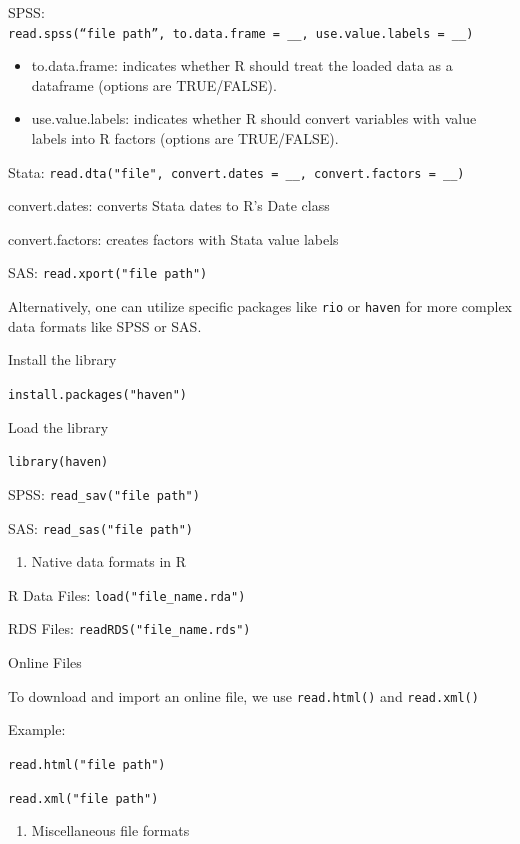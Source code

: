 \documentclass[
  letterpaper,
  DIV=11,
  numbers=noendperiod]{scrreprt}
\providecommand{\tightlist}{%
  \setlength{\itemsep}{0pt}\setlength{\parskip}{0pt}}\usepackage{longtable,booktabs,array}
\begin{document}
SPSS:
\texttt{read.spss(“file\ path”,\ to.data.frame\ =\ \_\_,\ use.value.labels\ =\ \_\_)}

\begin{itemize}
\item
  to.data.frame: indicates whether R should treat the loaded data as a
  dataframe (options are TRUE/FALSE).
\item
  use.value.labels: indicates whether R should convert variables with
  value labels into R factors (options are TRUE/FALSE).
\end{itemize}

Stata:
\texttt{read.dta("file",\ convert.dates\ =\ \_\_,\ convert.factors\ =\ \_\_)}

convert.dates: converts Stata dates to R's Date class

convert.factors: creates factors with Stata value labels

SAS: \texttt{read.xport("file\ path")}

Alternatively, one can utilize specific packages like \texttt{rio} or
\texttt{haven} for more complex data formats like SPSS or SAS.

Install the library

\texttt{install.packages("haven")}

Load the library

\texttt{library(haven)}

SPSS: \texttt{read\_sav("file\ path")}

SAS: \texttt{read\_sas("file\ path")}

\begin{enumerate}
\def\labelenumi{\alph{enumi}.}
\setcounter{enumi}{2}
\tightlist
\item
  Native data formats in R
\end{enumerate}

R Data Files: \texttt{load("file\_name.rda")}

RDS Files: \texttt{readRDS("file\_name.rds")}

Online Files

To download and import an online file, we use \texttt{read.html()} and
\texttt{read.xml()}

Example:

\texttt{read.html("file\ path")}

\texttt{read.xml("file\ path")}

\begin{enumerate}
\def\labelenumi{\alph{enumi}.}
\setcounter{enumi}{4}
\tightlist
\item
  Miscellaneous file formats
\end{enumerate}
\end{document}
